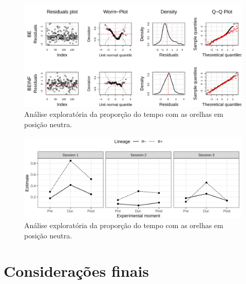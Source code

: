 \documentclass[
  ignorenonframetext,
  serif,
  professionalfont,
  usenames,
  dvipsnames,
  aspectratio = 169]{beamer}
\begin{document}
\begin{frame}{}
\protect\hypertarget{section-1}{}
\begin{figure}

{\centering \includegraphics[width=0.95\linewidth]{./img/mbetas} 

}

\caption{Análise exploratória da proporção do tempo com as orelhas em posição neutra.}\label{fig:unnamed-chunk-13}
\end{figure}
\end{frame}

\begin{frame}{}
\protect\hypertarget{section-2}{}
\begin{figure}

{\centering \includegraphics[width=0.95\linewidth]{./img/interaction} 

}

\caption{Análise exploratória da proporção do tempo com as orelhas em posição neutra.}\label{fig:unnamed-chunk-14}
\end{figure}
\end{frame}

\hypertarget{considerauxe7uxf5es-finais}{%
\section{Considerações finais}\label{considerauxe7uxf5es-finais}}
\end{document}
